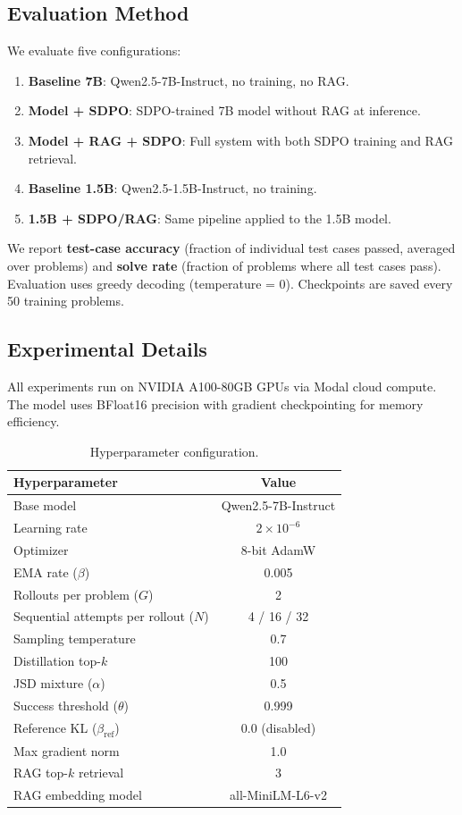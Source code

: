\documentclass[11pt]{article}
\begin{document}
\subsection{Evaluation Method}

We evaluate five configurations:
\begin{enumerate}[nosep]
    \item \textbf{Baseline 7B}: Qwen2.5-7B-Instruct, no training, no RAG.
    \item \textbf{Model + SDPO}: SDPO-trained 7B model without RAG at inference.
    \item \textbf{Model + RAG + SDPO}: Full system with both SDPO training and RAG retrieval.
    \item \textbf{Baseline 1.5B}: Qwen2.5-1.5B-Instruct, no training.
    \item \textbf{1.5B + SDPO/RAG}: Same pipeline applied to the 1.5B model.
\end{enumerate}

We report \textbf{test-case accuracy} (fraction of individual test cases passed, averaged over problems) and \textbf{solve rate} (fraction of problems where all test cases pass). Evaluation uses greedy decoding (temperature = 0). Checkpoints are saved every 50 training problems.

\subsection{Experimental Details}

All experiments run on NVIDIA A100-80GB GPUs via Modal cloud compute. The model uses BFloat16 precision with gradient checkpointing for memory efficiency.

\begin{table}[h]
\centering
\begin{tabular}{lc}
\toprule
\textbf{Hyperparameter} & \textbf{Value} \\
\midrule
Base model & Qwen2.5-7B-Instruct \\
Learning rate & $2 \times 10^{-6}$ \\
Optimizer & 8-bit AdamW \\
EMA rate ($\beta$) & 0.005 \\
Rollouts per problem ($G$) & 2 \\
Sequential attempts per rollout ($N$) & 4 / 16 / 32 \\
Sampling temperature & 0.7 \\
Distillation top-$k$ & 100 \\
JSD mixture ($\alpha$) & 0.5 \\
Success threshold ($\theta$) & 0.999 \\
Reference KL ($\beta_{\text{ref}}$) & 0.0 (disabled) \\
Max gradient norm & 1.0 \\
RAG top-$k$ retrieval & 3 \\
RAG embedding model & all-MiniLM-L6-v2 \\
\bottomrule
\end{tabular}
\caption{Hyperparameter configuration.}
\label{tab:hyperparams}
\end{table}
\end{document}

